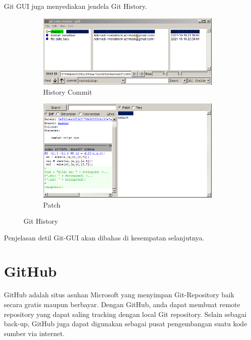 \documentclass[12pt]{book}
\begin{document}
	Git GUI juga menyediakan jendela Git History.

	\begin{figure}[!ht]
		\centering
		\begin{subfigure}[b]{0.45\textwidth}
			\includegraphics[width=\textwidth]{images/gitgui2}
			\caption{History Commit}
		\end{subfigure}
		\begin{subfigure}[b]{0.45\textwidth}
			\includegraphics[width=\textwidth]{images/gitgui3}
			\caption{Patch}
		\end{subfigure}
		\caption{Git History}
	\end{figure}

	Penjelasan detil Git-GUI akan dibahas di kesempatan selanjutnya.

	\newpage
	\section{GitHub}

	GitHub adalah situs asuhan Microsoft yang menyimpan Git-Repository baik secara gratis maupun berbayar.
	Dengan GitHub, anda dapat membuat remote repository yang dapat saling tracking dengan local Git repository.
	Selain sebagai back-up, GitHub juga dapat digunakan sebagai pusat pengembangan suatu kode sumber via internet.
\end{document}
